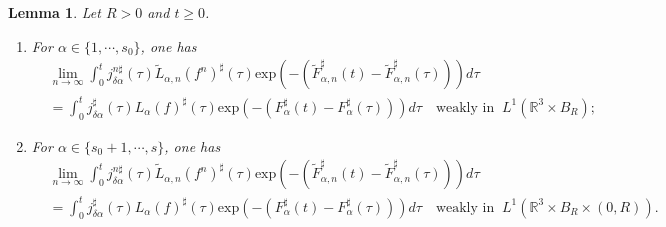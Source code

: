 \documentclass[reqno,11pt]{amsart}
\newtheorem{lemma}{Lemma}[section]
\numberwithin{equation}{section}
\def\R{\mathbb{R}}
\def\exp{\mathrm{exp}}
\begin{document}
\begin{lemma}\label{jnw}
	Let $R >0$ and $t \geq 0$. 
\begin{enumerate}
	\item {For $\alpha \in \{1,\cdots,s_0\}$, one has
	\begin{equation}\label{eq8.101-1}
		\begin{aligned}
			& \lim \limits_{n\rightarrow \infty} \int_{0}^{t} j^{n\sharp}_{\delta \alpha } (\tau) \tilde{L}_{\alpha ,n}(f^n)^\sharp (\tau) \exp(-(\tilde{F}^\sharp _{\alpha ,n } (t) - \tilde{F}^\sharp _{\alpha ,n } (\tau ))) d \tau \\
			&=\int_{0}^{t} j^{\sharp}_{\delta \alpha } (\tau) L_\alpha (f)^\sharp (\tau) \exp(-(F^\sharp _{\alpha } (t)- F^\sharp _{\alpha } (\tau))) d \tau \quad \text{weakly in }\ L^1(\R^3 \times B_R);
		\end{aligned}
	\end{equation}}
	\item {For $\alpha \in \{s_0+1,\cdots,s\}$, one has
	\begin{equation}\label{eq8.101}
		\begin{aligned}
			& \lim \limits_{n\rightarrow \infty} \int_{0}^{t} j^{n\sharp}_{\delta \alpha } (\tau) \tilde{L}_{\alpha ,n}(f^n)^\sharp (\tau) \exp(-(\tilde{F}^\sharp _{\alpha ,n } (t)- \tilde{F}^\sharp _{\alpha ,n } (\tau))) d \tau \\
			&=\int_{0}^{t} j^{\sharp}_{\delta \alpha } (\tau) L_\alpha (f)^\sharp (\tau) \exp(-(F^\sharp _{\alpha } (t)- F^\sharp _{\alpha } (\tau))) d \tau \quad \text{weakly in }\ L^1(\R^3 \times B_R\times (0,R)).
		\end{aligned}
\end{equation}}
\end{enumerate}		
\end{lemma}
\end{document}
